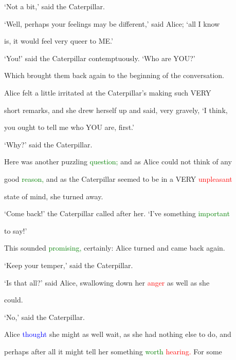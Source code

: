  ‘Not a bit,’ said the Caterpillar.



 ‘Well, perhaps your \textcolor{BurntOrange}{feelings} may be different,’ said Alice; ‘all I know

 is, it would feel very queer to ME.’



 ‘You!’ said the Caterpillar contemptuously. ‘Who are YOU?’



 Which brought them back again to the beginning of the conversation.

 Alice felt a little irritated at the Caterpillar’s making such VERY

 short remarks, and she drew herself up and said, very gravely, ‘I think,

 you ought to tell me who YOU are, first.’



 ‘Why?’ said the Caterpillar.



 Here was another puzzling \textcolor{green}{question;} and as Alice could not think of any

 \textcolor{BurntOrange}{good} \textcolor{green}{reason,} and as the Caterpillar seemed to be in a VERY \textcolor{red}{unpleasant}

 state of mind, she turned away.



 ‘Come back!’ the Caterpillar called after her. ‘I’ve something \textcolor{green}{important}

 to say!’



 This sounded \textcolor{green}{promising,} certainly: Alice turned and came back again.



 ‘Keep your temper,’ said the Caterpillar.



 ‘Is that all?’ said Alice, swallowing down her \textcolor{red}{anger} as well as she

 could.



 ‘No,’ said the Caterpillar.



 Alice \textcolor{blue}{thought} she might as well \textcolor{BurntOrange}{wait,} as she had nothing else to do, and

 perhaps after all it might tell her something \textcolor{green}{worth} \textcolor{red}{hearing.} For some

